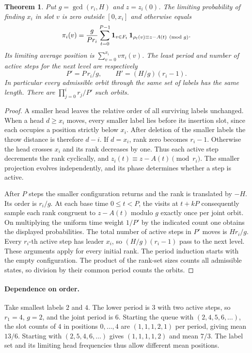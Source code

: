 \documentclass[11pt]{article}
\newtheorem{theorem}{Theorem}
\begin{document}
\begin{theorem}\label{th:dist}
Put $g=\gcd(r_i,H)$ and $z=z_i(0)$. The limiting probability of finding $x_i$ in slot $v$
is zero outside $[0,x_i]$ and otherwise equals
\[
 \pi_i(v)=\frac{g}{P r_i}\sum_{t=0}^{P-1}
 {\bf1}_{v\in F_t}\,{\bf1}_{\rho_t(v)\equiv z-A(t)\pmod g}.
\]
Its limiting average position is $\sum_{v=0}^{x_i}v\pi_i(v)$.
The least period and number of active steps for the \emph{next} level are respectively
\[
 P'=P\,r_i/g,\qquad H'=(H/g)(r_i-1).
\]
In particular every admissible orbit through the same set of labels has the same length.
There are $\prod_{j=0}^i r_j/P'$ such orbits.
\end{theorem}
\begin{proof}
A smaller head leaves the relative order of all surviving labels unchanged.
When a head $d\ge x_i$ moves, every smaller label lies before its insertion slot, since
each occupies a position strictly below $x_i$. After deletion of the smaller labels the
throw distance is therefore $d-i$. If $d=x_i$, rank zero becomes $r_i-1$. Otherwise the
head crosses $x_i$ and its rank decreases by one. Thus each active step decrements the
rank cyclically, and $z_i(t)\equiv z-A(t)\pmod{r_i}$. The smaller projection evolves
independently, and its phase determines whether a step is active.

After $P$ steps the smaller configuration returns and the rank is translated by $-H$.
Its order is $r_i/g$. At each base time $0\le t<P$, the visits at $t+kP$ consequently
sample each rank congruent to $z-A(t)$ modulo $g$ exactly once per joint orbit.
On multiplying the uniform time weight $1/P'$ by the indicated count one obtains the
displayed probabilities. The total number of active steps in $P'$ moves is $Hr_i/g$.
Every $r_i$-th active step has leader $x_i$, so $(H/g)(r_i-1)$ pass to the next level.
These arguments apply for every initial rank. The period induction starts with the empty
configuration. The product of the rank-set sizes counts all admissible states, so division
by their common period counts the orbits.
\end{proof}

\paragraph{Dependence on order.}
Take smallest labels $2$ and $4$. The lower period is $3$ with two active steps, so
$r_1=4$, $g=2$, and the joint period is $6$. Starting the queue with $(2,4,5,6,\ldots)$,
the slot counts of $4$ in positions $0,\ldots,4$ are $(1,1,1,2,1)$ per period, giving
mean $13/6$. Starting with $(2,5,4,6,\ldots)$ gives $(1,1,1,1,2)$ and mean $7/3$.
The label set and its limiting head frequencies thus allow different mean positions.
\end{document}
